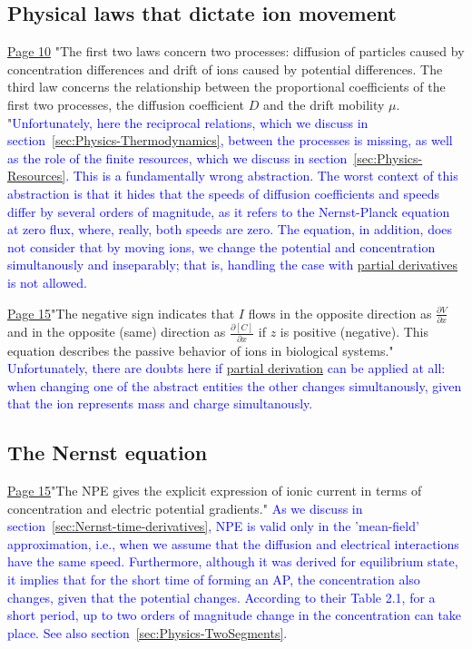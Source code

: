 \subsection{Physical laws that dictate ion movement\label{sec:Physics-PhysicalLaws}}
\href{https://rcweb.dartmouth.edu/~mvdm/wiki/lib/exe/fetch.php?media=analysis:johnstonwu.pdf}{Page 10} "The first two laws concern two processes: diffusion of particles caused
by concentration differences and drift of ions caused by potential differences. The third law concerns the relationship between the proportional
coefficients of the first two processes, the diffusion coefficient $D$ and the
drift mobility $\mu$. "\textcolor{blue}{Unfortunately, here the reciprocal relations, which we discuss in section~\ref{sec:Physics-Thermodynamics}, between the processes is missing, as well as the role of the finite resources, which we
discuss in section~\ref{sec:Physics-Resources}. This is a fundamentally wrong abstraction. The worst context of this abstraction is that it hides that the speeds of diffusion coefficients and speeds differ by several orders of magnitude, as it refers to the Nernst-Planck equation at zero flux, where, really, both speeds are zero. The equation, in addition, does not consider that by moving ions, we change the potential and concentration simultanously and
inseparably; that is, handling the case with \hyperlink{PartialDerivative}{partial derivatives} is not allowed.
}

\href{https://rcweb.dartmouth.edu/~mvdm/wiki/lib/exe/fetch.php?media=analysis:johnstonwu.pdf}{Page 15}"The
negative sign indicates that $I$ flows in the opposite direction as $\frac{\partial V}{\partial x}$ and in
the opposite (same) direction as $\frac{\partial [C]}{\partial x}$
if $z$ is positive (negative).
This equation describes the passive behavior of ions in biological systems."
\textcolor{blue}{Unfortunately, there are doubts here if \hyperlink{PartialDerivative}{partial derivation} can be applied at all: when changing one of the abstract entities the other changes simultanously, given that the ion represents mass and charge simultanously.}

\subsection{The Nernst equation\label{sec:Physics-NernstEquation}}
\href{https://rcweb.dartmouth.edu/~mvdm/wiki/lib/exe/fetch.php?media=analysis:johnstonwu.pdf}{Page 15}"The NPE gives the explicit expression of ionic current in terms of concentration and electric potential gradients." \textcolor{blue}{As we discuss in section~\ref{sec:Nernst-time-derivatives}, NPE is valid only in the 'mean-field' approximation, i.e., when we assume that the diffusion and electrical interactions have the same speed. Furthermore, although it was derived for equilibrium state, it implies that for the short time of forming an
AP, the concentration also changes, given that the potential changes. According to their Table 2.1, for a short period, up to two orders of magnitude change in the
concentration can take place. See also section~\ref{sec:Physics-TwoSegments}.
}

